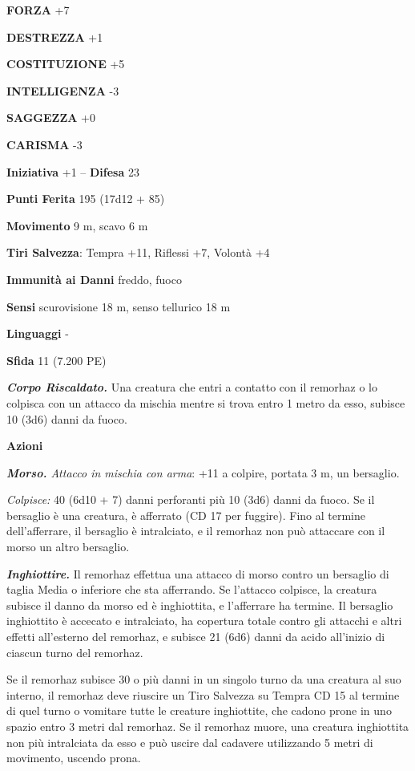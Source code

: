 \begin{multicols}{2}
\textbf{FORZA} +7

\textbf{DESTREZZA} +1

\textbf{COSTITUZIONE} +5

\textbf{INTELLIGENZA} -3

\textbf{SAGGEZZA} +0

\textbf{CARISMA} -3

\textbf{Iniziativa} +1 -- \textbf{Difesa} 23

\textbf{Punti Ferita} 195 (17d12 + 85)

\textbf{Movimento} 9 m, scavo 6 m

\textbf{Tiri Salvezza}: Tempra +11, Riflessi +7, Volontà +4

\textbf{Immunità ai Danni} freddo, fuoco

\textbf{Sensi} scurovisione 18 m, senso tellurico 18 m

\textbf{Linguaggi} -

\textbf{Sfida} 11 (7.200 PE)

\emph{\textbf{Corpo Riscaldato.}} Una creatura che entri a contatto con il remorhaz o lo colpisca con un attacco da mischia mentre si trova entro 1 metro da esso, subisce 10 (3d6) danni da fuoco.

\textbf{Azioni}

\emph{\textbf{Morso.} Attacco in mischia con arma}: +11 a colpire, portata 3 m, un bersaglio.

\emph{Colpisce:} 40 (6d10 + 7) danni perforanti più 10 (3d6) danni da fuoco. Se il bersaglio è una creatura, è afferrato (CD 17 per fuggire). Fino al termine dell'afferrare, il bersaglio è intralciato, e il remorhaz non può attaccare con il morso un altro bersaglio.

\emph{\textbf{Inghiottire.}} Il remorhaz effettua una attacco di morso contro un bersaglio di taglia Media o inferiore che sta afferrando. Se l'attacco colpisce, la creatura subisce il danno da morso ed è inghiottita, e l'afferrare ha termine. Il bersaglio inghiottito è accecato e intralciato, ha copertura totale contro gli attacchi e altri effetti all'esterno del remorhaz, e subisce 21 (6d6) danni da acido all'inizio di ciascun turno del remorhaz.

Se il remorhaz subisce 30 o più danni in un singolo turno da una creatura al suo interno, il remorhaz deve riuscire un Tiro Salvezza su Tempra CD 15 al termine di quel turno o vomitare tutte le creature inghiottite, che cadono prone in uno spazio entro 3 metri dal remorhaz. Se il remorhaz muore, una creatura inghiottita non   più intralciata da esso e può uscire dal cadavere utilizzando 5 metri di movimento, uscendo prona.


\end{multicols}
